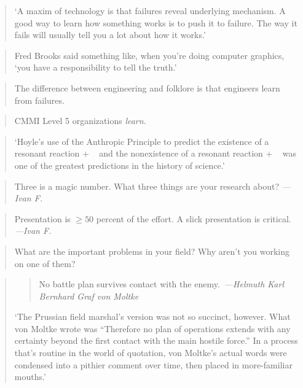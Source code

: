 \documentclass[a4paper]{article}
\begin{document}
\medskip
\begin{quote}
	`A maxim of technology is that failures reveal underlying mechanism.
	A good way to learn how something works is to push it to failure. The
	way it fails will usually tell you a lot about how it works.'~\cite{Blackwell2003}
\end{quote}

\medskip
\begin{quote}
	Fred Brooks said something like, when you're doing computer graphics,
	`you have a responsibility to tell the truth.'~\cite{Brodlie2008}
\end{quote}

\medskip
\begin{quote}
	The difference between engineering and folklore is that engineers
	learn from failures.~\cite{Loughry2007}
\end{quote}

\medskip
\begin{quote}
	CMMI Level 5 organizations \emph{learn}.~\cite{Loughry2007}
\end{quote}

\medskip
\begin{quote}
	`Hoyle's use of the Anthropic Principle to predict the existence of a
	resonant reaction  +  \chemarrow\ 
	and the nonexistence of a resonant reaction
	 +  \chemarrow\ 
	was one of the greatest predictions in the history of science.'~\cite{Fadel2008}
\end{quote}

\medskip
\begin{quote}
	Three is a magic number.  What three things are your research about?
	\emph{---Ivan F.}
\end{quote}

\medskip
\begin{quote}
	Presentation is $\ge 50$ percent of the effort.  A slick presentation
	is critical. \emph{---Ivan F.}
\end{quote}

\medskip
\begin{quote}
	What are the important problems in your field?  Why aren't you working
	on one of them?~\cite{Hamming1986}
\end{quote}

\medskip
\begin{quote}
	\begin{quote}
		No battle plan survives contact with the enemy.~\emph{---Helmuth Karl Bernhard {Graf von Moltke}}
	\end{quote}

	`The Prussian field marshal's version was not so succinct, however.
	What von Moltke wrote was ``Therefore no plan of operations extends
	with any certainty beyond the first contact with the main hostile force.''
	In a process that's routine in the world of quotation, von Moltke's actual
	words were condensed into a pithier comment over time, then placed in
	more-familiar mouths.'~\cite{Keyes2006}
\end{quote}
\end{document}
